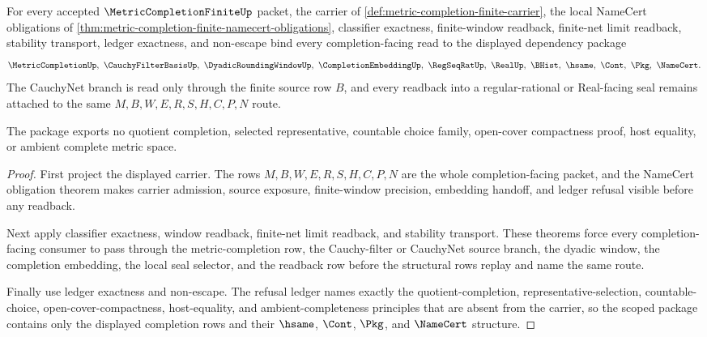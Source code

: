 \begin{theorem}
\label{thm:metric-completion-finite-scoped-dependency-package}
For every accepted $\MetricCompletionFiniteUp$ packet, the carrier of
\autoref{def:metric-completion-finite-carrier}, the local NameCert obligations
of \autoref{thm:metric-completion-finite-namecert-obligations}, classifier
exactness, finite-window readback, finite-net limit readback, stability
transport, ledger exactness, and non-escape bind every completion-facing read
to the displayed dependency package
$$
\MetricCompletionUp,\ \CauchyFilterBasisUp,\ \DyadicRoundingWindowUp,\ \CompletionEmbeddingUp,\ \RegSeqRatUp,\ \RealUp,\ \BHist,\ \hsame,\ \Cont,\ \Pkg,\ \NameCert .
$$
The CauchyNet branch is read only through the finite source row $B$, and every
readback into a regular-rational or Real-facing seal remains attached to the
same $M,B,W,E,R,S,H,C,P,N$ route.

The package exports no quotient completion, selected representative, countable
choice family, open-cover compactness proof, host equality, or ambient complete
metric space.
\end{theorem}
\begin{proof}
First project the displayed carrier. The rows
$M,B,W,E,R,S,H,C,P,N$ are the whole completion-facing packet, and the NameCert
obligation theorem makes carrier admission, source exposure, finite-window
precision, embedding handoff, and ledger refusal visible before any readback.

Next apply classifier exactness, window readback, finite-net limit readback,
and stability transport. These theorems force every completion-facing consumer
to pass through the metric-completion row, the Cauchy-filter or CauchyNet
source branch, the dyadic window, the completion embedding, the local seal
selector, and the readback row before the structural rows replay and name the
same route.

Finally use ledger exactness and non-escape. The refusal ledger names exactly
the quotient-completion, representative-selection, countable-choice,
open-cover-compactness, host-equality, and ambient-completeness principles
that are absent from the carrier, so the scoped package contains only the
displayed completion rows and their $\hsame$, $\Cont$, $\Pkg$, and $\NameCert$
structure.
\end{proof}

